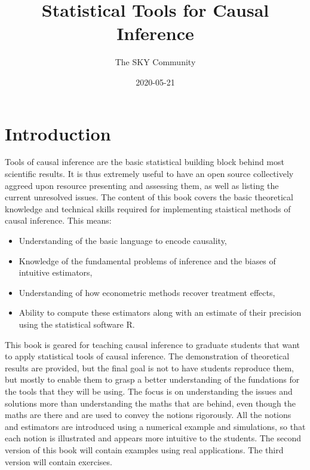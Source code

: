 \documentclass[]{book}
\title{Statistical Tools for Causal Inference}
\author{The SKY Community}
\date{2020-05-21}
\providecommand{\tightlist}{%
  \setlength{\itemsep}{0pt}\setlength{\parskip}{0pt}}
\theoremstyle{definition}
\theoremstyle{definition}
\theoremstyle{definition}
\theoremstyle{remark}
\begin{document}
\maketitle

{
\setcounter{tocdepth}{0}
\tableofcontents
}
\hypertarget{introduction}{%
\chapter*{Introduction}\label{introduction}}

Tools of causal inference are the basic statistical building block behind most scientific results.
It is thus extremely useful to have an open source collectively aggreed upon resource presenting and assessing them, as well as listing the current unresolved issues.
The content of this book covers the basic theoretical knowledge and technical skills required for implementing staistical methods of causal inference.
This means:

\begin{itemize}
\tightlist
\item
  Understanding of the basic language to encode causality,
\item
  Knowledge of the fundamental problems of inference and the biases of intuitive estimators,
\item
  Understanding of how econometric methods recover treatment effects,
\item
  Ability to compute these estimators along with an estimate of their precision using the statistical software R.
\end{itemize}

This book is geared for teaching causal inference to graduate students that want to apply statistical tools of causal inference.
The demonstration of theoretical results are provided, but the final goal is not to have students reproduce them, but mostly to enable them to grasp a better understanding of the fundations for the tools that they will be using.
The focus is on understanding the issues and solutions more than understanding the maths that are behind, even though the maths are there and are used to convey the notions rigorously.
All the notions and estimators are introduced using a numerical example and simulations, so that each notion is illustrated and appears more intuitive to the students.
The second version of this book will contain examples using real applications.
The third version will contain exercises.
\end{document}
